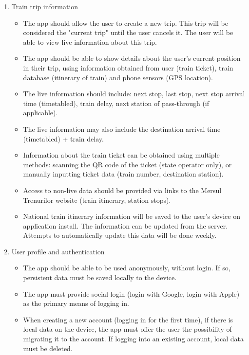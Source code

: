 \begin{enumerate}
    \item Train trip information
          \begin{itemize}
              \item The app should allow the user to create a new trip. This trip will be considered the "current trip" until the user cancels it. The user will be able to view live information about this trip.
              \item The app should be able to show details about the user's current position in their trip, using information obtained from user (train ticket), train database (itinerary of train) and phone sensors (GPS location).
              \item The live information should include: next stop, last stop, next stop arrival time (timetabled), train delay, next station of pass-through (if applicable).
              \item The live information may also include the destination arrival time (time\-tabled) + train delay.
              \item Information about the train ticket can be obtained using multiple methods: scanning the QR code of the ticket (state operator only), or manually inputting ticket data (train number, destination station).
              \item Access to non-live data should be provided via links to the Mersul Trenu\-rilor website (train itinerary, station stops).
              \item National train itinerary information will be saved to the user's device on application install. The information can be updated from the server. Attempts to automatically update this data will be done weekly.
          \end{itemize}
    \item User profile and authentication
          \begin{itemize}
              \item The app should be able to be used anonymously, without login. If so, persistent data must be saved locally to the device.
              \item The app must provide social login (login with Google, login with Apple) as the primary means of logging in.
              \item When creating a new account (logging in for the first time), if there is local data on the device, the app must offer the user the possibility of migrating it to the account. If logging into an existing account, local data must be deleted.

\end{itemize}
\end{enumerate}
